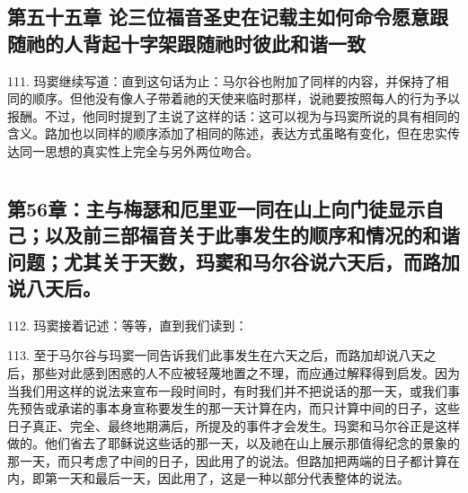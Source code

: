 
\subsection{第五十五章 论三位福音圣史在记载主如何命令愿意跟随祂的人背起十字架跟随祂时彼此和谐一致}

111. 玛窦继续写道：直到这句话为止：马尔谷也附加了同样的内容，并保持了相同的顺序。但他没有像人子带着祂的天使来临时那样，说祂要按照每人的行为予以报酬。不过，他同时提到了主说了这样的话：这可以视为与玛窦所说的具有相同的含义。路加也以同样的顺序添加了相同的陈述，表达方式虽略有变化，但在忠实传达同一思想的真实性上完全与另外两位吻合。\par



\section{}


\subsection{第56章：主与梅瑟和厄里亚一同在山上向门徒显示自己；以及前三部福音关于此事发生的顺序和情况的和谐问题；尤其关于天数，玛窦和马尔谷说六天后，而路加说八天后。}

112. 玛窦接着记述：等等，直到我们读到：\par

113. 至于马尔谷与玛窦一同告诉我们此事发生在六天之后，而路加却说八天之后，那些对此感到困惑的人不应被轻蔑地置之不理，而应通过解释得到启发。因为当我们用这样的说法来宣布一段时间时，有时我们并不把说话的那一天，或我们事先预告或承诺的事本身宣称要发生的那一天计算在内，而只计算中间的日子，这些日子真正、完全、最终地期满后，所提及的事件才会发生。玛窦和马尔谷正是这样做的。他们省去了耶稣说这些话的那一天，以及祂在山上展示那值得纪念的景象的那一天，而只考虑了中间的日子，因此用了的说法。但路加把两端的日子都计算在内，即第一天和最后一天，因此用了，这是一种以部分代表整体的说法。\par

